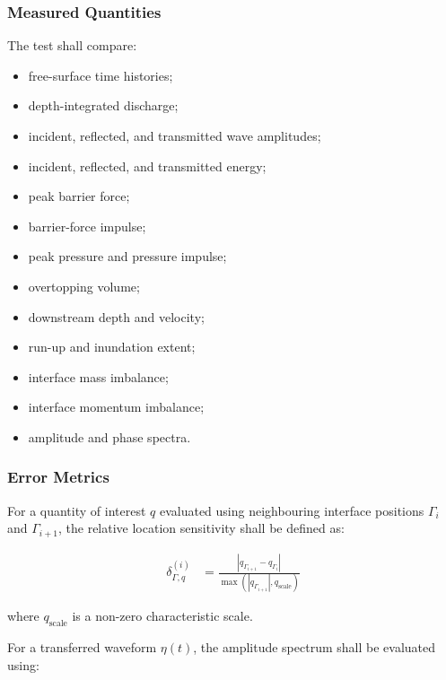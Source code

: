 \subsubsection{Measured Quantities}
\label{sec:res-ver-tst-interface-location-quantities}

The test shall compare:

\begin{itemize}
  \item free-surface time histories;
  \item depth-integrated discharge;
  \item incident, reflected, and transmitted wave amplitudes;
  \item incident, reflected, and transmitted energy;
  \item peak barrier force;
  \item barrier-force impulse;
  \item peak pressure and pressure impulse;
  \item overtopping volume;
  \item downstream depth and velocity;
  \item run-up and inundation extent;
  \item interface mass imbalance;
  \item interface momentum imbalance;
  \item amplitude and phase spectra.
\end{itemize}

\subsubsection{Error Metrics}
\label{sec:res-ver-tst-interface-location-error}

For a quantity of interest $q$ evaluated using neighbouring interface
positions $\Gamma_i$ and $\Gamma_{i+1}$, the relative location
sensitivity shall be defined as:

\begin{align}
  \delta_{\Gamma,q}^{(i)}
  &=
  \frac{
    \left|
    q_{\Gamma_{i+1}}
    -
    q_{\Gamma_i}
    \right|
  }{
    \max
    \left(
      \left|q_{\Gamma_{i+1}}\right|,
      q_{\mathrm{scale}}
    \right)
  }
  \label{eq:res-ver-tst-interface-location-sensitivity}
\end{align}

where $q_{\mathrm{scale}}$ is a non-zero characteristic scale.

For a transferred waveform $\eta(t)$, the amplitude spectrum shall be
evaluated using:


